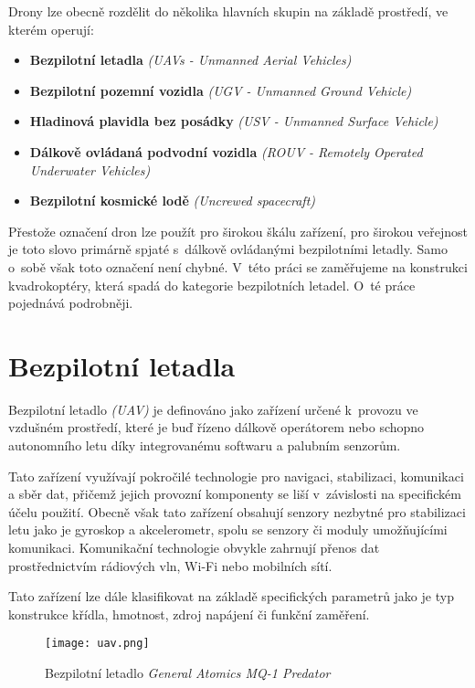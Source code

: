 \documentclass[12pt]{report}
\begin{document}
Drony lze obecně rozdělit do několika hlavních skupin na základě prostředí, ve kterém operují:
\begin{itemize}
	\item \textbf{Bezpilotní letadla} \textit{(UAVs - Unmanned Aerial Vehicles)}
	\item \textbf{Bezpilotní pozemní vozidla} \textit{(UGV - Unmanned Ground Vehicle)}
	\item \textbf{Hladinová plavidla bez posádky} \textit{(USV - Unmanned Surface Vehicle)}
	\item \textbf{Dálkově ovládaná podvodní vozidla} \textit{(ROUV - Remotely Operated Underwater Vehicles)}
	\item \textbf{Bezpilotní kosmické lodě} \textit{(Uncrewed spacecraft)}
\end{itemize}

Přestože označení dron lze použít pro širokou škálu zařízení, pro širokou veřejnost je toto slovo primárně spjaté s~dálkově ovládanými bezpilotními letadly. Samo o~sobě však toto označení není chybné. V~této práci se zaměřujeme na konstrukci kvadrokoptéry, která spadá do kategorie bezpilotních letadel. O~té práce pojednává podrobněji. \cite{mainbook}

\section[Bezpilotní letadla]{Bezpilotní letadla}
Bezpilotní letadlo \textit{(UAV)} je definováno jako zařízení určené k~provozu ve vzdušném prostředí, které je buď řízeno dálkově operátorem nebo schopno autonomního letu díky integrovanému softwaru a palubním senzorům.

Tato zařízení využívají pokročilé technologie pro navigaci, stabilizaci, komunikaci a sběr dat, přičemž jejich provozní komponenty se liší v~závislosti na specifickém účelu použití. Obecně však tato zařízení obsahují senzory nezbytné pro stabilizaci letu jako je gyroskop a akcelerometr, spolu se senzory či moduly umožňujícími komunikaci. Komunikační technologie obvykle zahrnují přenos dat prostřednictvím rádiových vln, Wi-Fi nebo mobilních sítí.

Tato zařízení lze dále klasifikovat na základě specifických parametrů jako je typ konstrukce křídla, hmotnost, zdroj napájení či funkční zaměření.

\begin{figure}[H]
	\centering
	\texttt{[image: uav.png]}
	\caption{Bezpilotní letadlo \textit{General Atomics MQ-1 Predator} \cite{mainbook}}
	\label{fig:uav.png}
  \end{figure}
\end{document}
